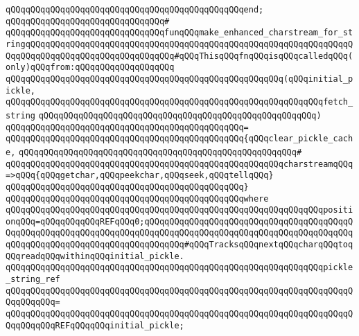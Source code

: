 \verb|qQQqqQQqqQQqqQQqqQQqqQQqqQQqqQQqqQQqqQQqqQQqqQQqend;|\newline
\newline
\verb|qQQqqQQqqQQqqQQqqQQqqQQqqQQqqQQq#|\newline
\verb|qQQqqQQqqQQqqQQqqQQqqQQqqQQqqQQqfunqQQqmake_enhanced_charstream_for_stringqQQqqQQqqQQqqQQqqQQqqQQqqQQqqQQqqQQqqQQqqQQqqQQqqQQqqQQqqQQqqQQqqQQqqQQqqQQqqQQqqQQqqQQqqQQqqQQqqQQq#qQQqThisqQQqfnqQQqisqQQqcalledqQQq(only)qQQqfrom:qQQqqQQqqQQqqQQqqQQq|\newline
\verb|qQQqqQQqqQQqqQQqqQQqqQQqqQQqqQQqqQQqqQQqqQQqqQQqqQQqqQQq(qQQqinitial_pickle,|\newline
\verb|qQQqqQQqqQQqqQQqqQQqqQQqqQQqqQQqqQQqqQQqqQQqqQQqqQQqqQQqqQQqqQQqfetch_string|\newline
\verb|qQQqqQQqqQQqqQQqqQQqqQQqqQQqqQQqqQQqqQQqqQQqqQQqqQQqqQQq)|\newline
\verb|qQQqqQQqqQQqqQQqqQQqqQQqqQQqqQQqqQQqqQQqqQQqqQQq=|\newline
\verb|qQQqqQQqqQQqqQQqqQQqqQQqqQQqqQQqqQQqqQQqqQQqqQQq{qQQqclear_pickle_cache,|\newline
\verb|qQQqqQQqqQQqqQQqqQQqqQQqqQQqqQQqqQQqqQQqqQQqqQQqqQQqqQQq#|\newline
\verb|qQQqqQQqqQQqqQQqqQQqqQQqqQQqqQQqqQQqqQQqqQQqqQQqqQQqqQQqcharstreamqQQq=>qQQq{qQQqgetchar,qQQqpeekchar,qQQqseek,qQQqtellqQQq}|\newline
\verb|qQQqqQQqqQQqqQQqqQQqqQQqqQQqqQQqqQQqqQQqqQQqqQQq}|\newline
\verb|qQQqqQQqqQQqqQQqqQQqqQQqqQQqqQQqqQQqqQQqqQQqqQQqwhere|\newline
\verb|qQQqqQQqqQQqqQQqqQQqqQQqqQQqqQQqqQQqqQQqqQQqqQQqqQQqqQQqqQQqqQQqpositionqQQq=qQQqqQQqqQQqREFqQQq0;qQQqqQQqqQQqqQQqqQQqqQQqqQQqqQQqqQQqqQQqqQQqqQQqqQQqqQQqqQQqqQQqqQQqqQQqqQQqqQQqqQQqqQQqqQQqqQQqqQQqqQQqqQQqqQQqqQQqqQQqqQQqqQQqqQQqqQQqqQQqqQQqqQQq#qQQqTracksqQQqnextqQQqcharqQQqtoqQQqreadqQQqwithinqQQqinitial_pickle.|\newline
\newline
\verb|qQQqqQQqqQQqqQQqqQQqqQQqqQQqqQQqqQQqqQQqqQQqqQQqqQQqqQQqqQQqqQQqpickle_string_ref|\newline
\verb|qQQqqQQqqQQqqQQqqQQqqQQqqQQqqQQqqQQqqQQqqQQqqQQqqQQqqQQqqQQqqQQqqQQqqQQqqQQqqQQq=|\newline
\verb|qQQqqQQqqQQqqQQqqQQqqQQqqQQqqQQqqQQqqQQqqQQqqQQqqQQqqQQqqQQqqQQqqQQqqQQqqQQqqQQqREFqQQqqQQqinitial_pickle;|\newline
